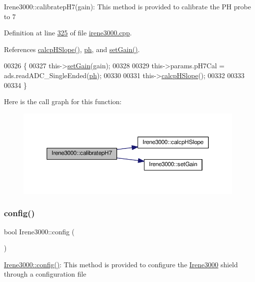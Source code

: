 Irene3000\+::calibratep\+H7(gain)\+: This method is provided to calibrate the PH probe to 7 

Definition at line \hyperlink{irene3000_8cpp_source_l00325}{325} of file \hyperlink{irene3000_8cpp_source}{irene3000.\+cpp}.



References \hyperlink{irene3000_8cpp_source_l00359}{calcp\+H\+Slope()}, \hyperlink{_irene3000_8h_source_l00027}{ph}, and \hyperlink{irene3000_8cpp_source_l00242}{set\+Gain()}.


\begin{DoxyCode}
00326 \{
00327     this->\hyperlink{class_irene3000_aff7c5da186b388e7272e63ff88a20c34}{setGain}(gain);
00328         
00329     this->params.pH7Cal = ads.readADC\_SingleEnded(\hyperlink{_irene3000_8h_af771ceafe0e6524dd8497d4305dfe778}{ph});
00330  
00331     this->\hyperlink{class_irene3000_a81f6a79e546679692053f7ac1af49613}{calcpHSlope}();
00332 
00333 
00334 \}
\end{DoxyCode}
Here is the call graph for this function\+:
\nopagebreak
\begin{figure}[H]
\begin{center}
\leavevmode
\includegraphics[width=350pt]{class_irene3000_a2e810ddfa8b95eaa2446a408761c6bdc_cgraph}
\end{center}
\end{figure}
\mbox{\label{class_irene3000_afed5c35e4b23963c157847ef27c11e9c}} 
\subsubsection{\texorpdfstring{config()}{config()}}
{\footnotesize\ttfamily bool Irene3000\+::config (\begin{DoxyParamCaption}{ }\end{DoxyParamCaption})}

\hyperlink{class_irene3000_afed5c35e4b23963c157847ef27c11e9c}{Irene3000\+::config()}\+: This method is provided to configure the \hyperlink{class_irene3000}{Irene3000} shield through a configuration file

